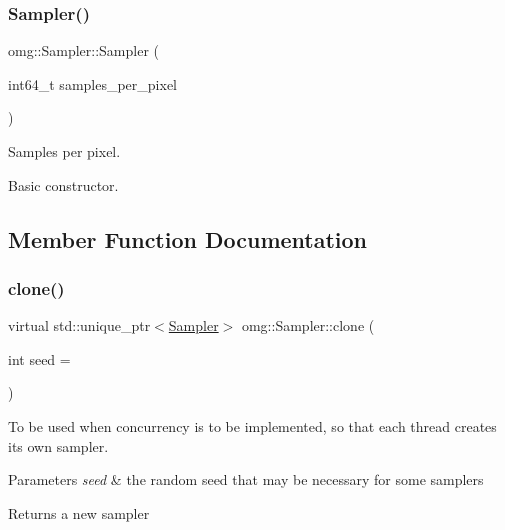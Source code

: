 \subsubsection{\texorpdfstring{Sampler()}{Sampler()}}
{\footnotesize\ttfamily omg\+::\+Sampler\+::\+Sampler (\begin{DoxyParamCaption}\item[{int64\+\_\+t}]{samples\+\_\+per\+\_\+pixel }\end{DoxyParamCaption})\hspace{0.3cm}{\ttfamily [inline]}}



Samples per pixel. 

Basic constructor. 

\subsection{Member Function Documentation}
\mbox{\label{classomg_1_1_sampler_ae546e8114ce2d6fc1b760c10a73f6d71}} 
\subsubsection{\texorpdfstring{clone()}{clone()}}
{\footnotesize\ttfamily virtual std\+::unique\+\_\+ptr$<$\mbox{\hyperlink{classomg_1_1_sampler}{Sampler}}$>$ omg\+::\+Sampler\+::clone (\begin{DoxyParamCaption}\item[{int}]{seed = {} }\end{DoxyParamCaption})\hspace{0.3cm}{\ttfamily [pure virtual]}}



To be used when concurrency is to be implemented, so that each thread creates its own sampler. 


\begin{DoxyParams}{Parameters}
{\em seed} & the random seed that may be necessary for some samplers \\
\hline
\end{DoxyParams}
\begin{DoxyReturn}{Returns}
a new sampler 
\end{DoxyReturn}
\mbox{\label{classomg_1_1_sampler_ab577767afd5ef449d815493b81d8d7e0}} 
